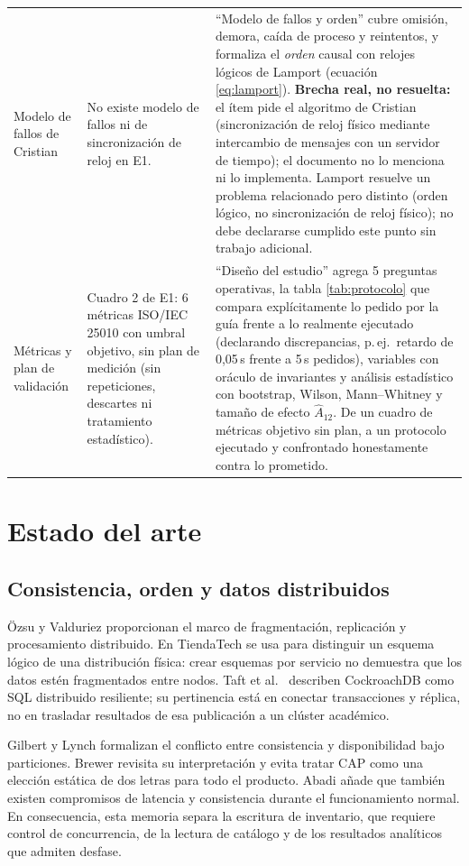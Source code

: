 \documentclass[12pt,a4paper]{article}
\newcommand{\seccion}[1]{\section{#1}}
\begin{document}
\begin{longtable}{>{\raggedright\arraybackslash}p{2.9cm}>{\raggedright\arraybackslash}p{5.5cm}>{\raggedright\arraybackslash}p{6.2cm}}
2.7 Modelo de fallos de Cristian &
No existe modelo de fallos ni de sincronización de reloj en E1. &
``Modelo de fallos y orden'' cubre omisión, demora, caída de proceso y reintentos, y formaliza el \emph{orden} causal con relojes lógicos de Lamport (ecuación \ref{eq:lamport}). \textbf{Brecha real, no resuelta:} el ítem pide el algoritmo de Cristian (sincronización de reloj físico mediante intercambio de mensajes con un servidor de tiempo); el documento no lo menciona ni lo implementa. Lamport resuelve un problema relacionado pero distinto (orden lógico, no sincronización de reloj físico); no debe declararse cumplido este punto sin trabajo adicional.\\

2.8 Métricas y plan de validación &
Cuadro 2 de E1: 6 métricas ISO/IEC 25010 con umbral objetivo, sin plan de medición (sin repeticiones, descartes ni tratamiento estadístico). &
``Diseño del estudio'' agrega 5 preguntas operativas, la tabla \ref{tab:protocolo} que compara explícitamente lo pedido por la guía frente a lo realmente ejecutado (declarando discrepancias, p.\,ej.\ retardo de 0,05\,s frente a 5\,s pedidos), variables con oráculo de invariantes y análisis estadístico con bootstrap, Wilson, Mann--Whitney y tamaño de efecto $\widehat A_{12}$. De un cuadro de métricas objetivo sin plan, a un protocolo ejecutado y confrontado honestamente contra lo prometido.\\

\end{longtable}



\seccion{Estado del arte}
\subsection{Consistencia, orden y datos distribuidos}
Özsu y Valduriez \cite{ozsu2020principles} proporcionan el marco de fragmentación, replicación y procesamiento distribuido. En TiendaTech se usa para distinguir un esquema lógico de una distribución física: crear esquemas por servicio no demuestra que los datos estén fragmentados entre nodos. Taft et al.\ \cite{taft2020cockroachdb} describen CockroachDB como SQL distribuido resiliente; su pertinencia está en conectar transacciones y réplica, no en trasladar resultados de esa publicación a un clúster académico.

Gilbert y Lynch \cite{gilbert2002} formalizan el conflicto entre consistencia y disponibilidad bajo particiones. Brewer \cite{brewer2012cap} revisita su interpretación y evita tratar CAP como una elección estática de dos letras para todo el producto. Abadi \cite{abadi2012consistency} añade que también existen compromisos de latencia y consistencia durante el funcionamiento normal. En consecuencia, esta memoria separa la escritura de inventario, que requiere control de concurrencia, de la lectura de catálogo y de los resultados analíticos que admiten desfase.
\end{document}
